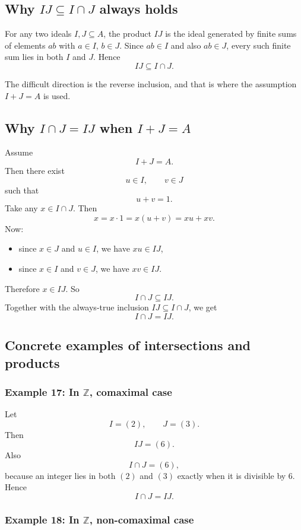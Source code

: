 \documentclass[12pt,a4paper]{article}
\theoremstyle{notespace}
\begin{document}
\subsection{Why \(IJ\subseteq I\cap J\) always holds}

For any two ideals \(I,J\subseteq A\), the product \(IJ\) is the ideal generated by finite sums of elements \(ab\) with \(a\in I\), \(b\in J\). Since \(ab\in I\) and also \(ab\in J\), every such finite sum lies in both \(I\) and \(J\). Hence
\[
IJ\subseteq I\cap J.
\]

The difficult direction is the reverse inclusion, and that is where the assumption \(I+J=A\) is used.

\subsection{Why \(I\cap J=IJ\) when \(I+J=A\)}

Assume
\[
I+J=A.
\]
Then there exist
\[
u\in I,\qquad v\in J
\]
such that
\[
u+v=1.
\]
Take any \(x\in I\cap J\). Then
\[
x=x\cdot 1=x(u+v)=xu+xv.
\]
Now:

\begin{itemize}
	\item since \(x\in J\) and \(u\in I\), we have \(xu\in IJ\),
	\item since \(x\in I\) and \(v\in J\), we have \(xv\in IJ\).
\end{itemize}

Therefore \(x\in IJ\). So
\[
I\cap J\subseteq IJ.
\]
Together with the always-true inclusion \(IJ\subseteq I\cap J\), we get
\[
I\cap J=IJ.
\]

\subsection{Concrete examples of intersections and products}

\subsubsection*{Example 17: In \(\mathbb Z\), comaximal case}

Let
\[
I=(2),\qquad J=(3).
\]
Then
\[
IJ=(6).
\]
Also
\[
I\cap J=(6),
\]
because an integer lies in both \((2)\) and \((3)\) exactly when it is divisible by \(6\). Hence
\[
I\cap J=IJ.
\]

\subsubsection*{Example 18: In \(\mathbb Z\), non-comaximal case}
\end{document}
